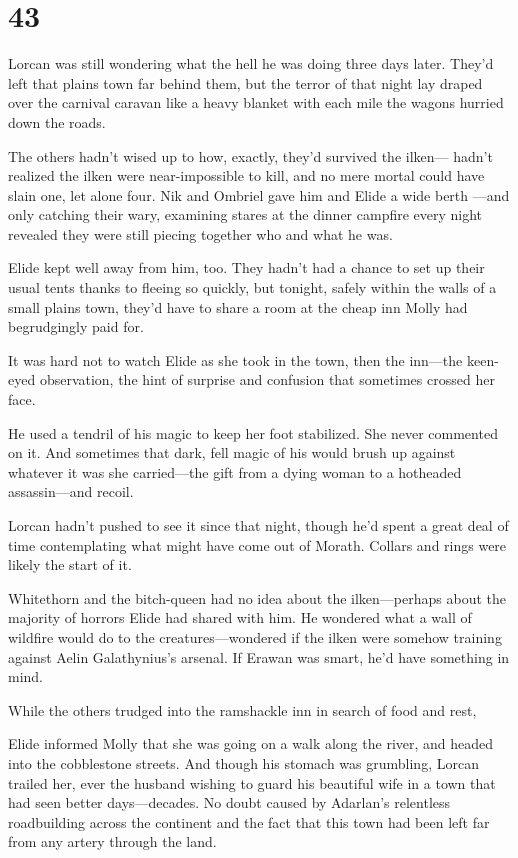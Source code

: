 
\chapter{43}

Lorcan was still wondering what the hell he was doing three days later.
They'd left that plains town far behind them, but the terror of that night lay draped over the carnival caravan like a heavy blanket with each mile the wagons hurried down the roads.

The others hadn't wised up to how, exactly, they'd survived the ilken--- hadn't realized the ilken were near-impossible to kill, and no mere mortal could have slain one, let alone four.
Nik and Ombriel gave him and Elide a wide berth ---and only catching their wary, examining stares at the dinner campfire every night revealed they were still piecing together who and what he was.

Elide kept well away from him, too.
They hadn't had a chance to set up their usual tents thanks to fleeing so quickly, but tonight, safely within the walls of a small plains town, they'd have to share a room at the cheap inn Molly had begrudgingly paid for.

It was hard not to watch Elide as she took in the town, then the inn---the keen-eyed observation, the hint of surprise and confusion that sometimes crossed her face.

He used a tendril of his magic to keep her foot stabilized.
She never commented on it.
And sometimes that dark, fell magic of his would brush up against whatever it was she carried---the gift from a dying woman to a hotheaded assassin---and recoil.

Lorcan hadn't pushed to see it since that night, though he'd spent a great deal of time contemplating what might have come out of Morath.
Collars and rings were likely the start of it.

Whitethorn and the bitch-queen had no idea about the ilken---perhaps about the majority of horrors Elide had shared with him.
He wondered what a wall of wildfire would do to the creatures---wondered if the ilken were somehow training against Aelin Galathynius's arsenal.
If Erawan was smart, he'd have something in mind.

While the others trudged into the ramshackle inn in search of food and rest,

Elide informed Molly that she was going on a walk along the river, and headed into the cobblestone streets.
And though his stomach was grumbling, Lorcan trailed her, ever the husband wishing to guard his beautiful wife in a town that had seen better days---decades.
No doubt caused by Adarlan's relentless roadbuilding across the continent and the fact that this town had been left far from any artery through the land.


